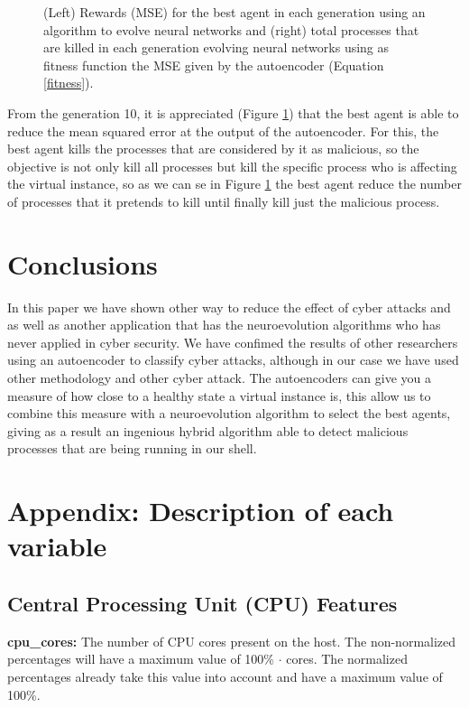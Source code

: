 \documentclass{iosart2c}
\begin{document}
\begin{figure}[h!]
\begin{subfigure}{.49\linewidth}
\end{subfigure}
\caption{(Left) Rewards (MSE) for the best agent in each generation using an algorithm to evolve neural networks and (right) total processes that are killed in each generation evolving neural networks using as fitness function the MSE given by the autoencoder (Equation \ref{fitness}).}
\label{fig:reward_top_agent}
\end{figure}

From the generation 10, it is appreciated (Figure \ref{fig:reward_top_agent}) that the best agent is able to reduce the mean squared error at the output of the autoencoder. For this, the best agent kills the processes that are considered by it as malicious, so the objective is not only kill all processes but kill the specific process who is affecting the virtual instance, so as we can se in Figure \ref{fig:reward_top_agent} the best agent reduce the number of processes that it pretends to kill until finally kill just the malicious process.\\


\section{Conclusions}

In this paper we have shown other way to reduce the effect of cyber attacks and as well as another application that has the neuroevolution algorithms who has never applied in cyber security. We have confimed the results of other researchers \cite{autoencoderdos} using an autoencoder to classify cyber attacks, although in our case we have used other methodology and other cyber attack. The autoencoders can give you a measure of how close to a healthy state a virtual instance is, this allow us to combine this measure with a neuroevolution algorithm to select the best agents, giving as a result an ingenious hybrid algorithm able to detect malicious processes that are being running in our shell. 


\appendix
\section{Appendix: Description of each variable}\label{appx_variables}

\subsection{Central Processing Unit (CPU) Features}

\textbf{cpu\_cores:} The number of CPU cores present on the host. The non-normalized percentages will have a maximum value of 100\% $\cdot$ cores. The normalized percentages already take this value into account and have a maximum value of 100\%.\\
\end{document}
